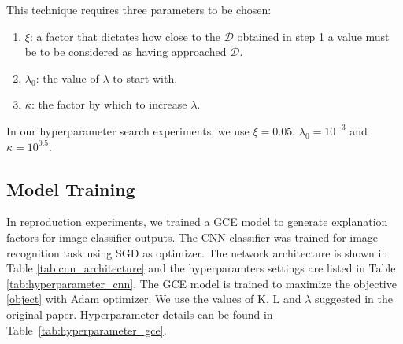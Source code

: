 This technique requires three parameters to be chosen:
\begin{enumerate}
	\item $\xi$: a factor that dictates how close to the $\mathcal{D}$ obtained in step 1 a value must be to be considered as having approached $\mathcal{D}$.
	\item $\lambda_0$: the value of $\lambda$ to start with.
	\item $\kappa$: the factor by which to increase $\lambda$.
\end{enumerate}
In our hyperparameter search experiments, we use $\xi = 0.05$, $\lambda_0 = 10^{-3}$ and $\kappa = 10^{0.5}$.

\subsection{Model Training}
In reproduction experiments, we trained a GCE model to generate explanation factors for image classifier outputs. The CNN classifier was trained for image recognition task using SGD as optimizer. The network architecture is shown in Table \ref{tab:cnn_architecture} and the hyperparamters settings are listed in Table \ref{tab:hyperparameter_cnn}. The GCE model is trained to maximize the objective \ref{object} with Adam optimizer. We use the values of K, L and $\lambda$  suggested in the original paper. Hyperparameter details can be found in Table~\ref{tab:hyperparameter_gce}. 



